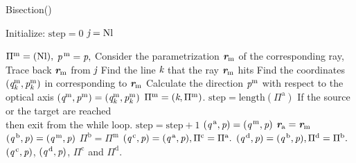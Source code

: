 \begin{algorithm}
\caption{Bisection()}\label{alg:bisection}
Initialize: $\textrm{step} = 0$ $\textit{j} = \textrm{Nl}$
\begin{algorithmic}[1]
\State $\Pi^{\textrm{m}}= (\textrm{Nl}),$
\State $\textit{p}^{\,\textrm{m}}=\textit{p},$
\State Consider the parametrization $\textit{\textbf{r}}_{\textrm{m}}$ of the corresponding ray,
\State Trace back $\textit{\textbf{r}}_{\textrm{m}}$ from $\textit{j}$
\State Find the line $\textit{k}$ that the ray $\textit{\textbf{r}}_{\textrm{m}}$ hits 
\State Find the coordinates $(\textit{q}^{\textrm{m}}_{\textit{k}}, \textit{p}^{\textrm{m}}_{\textit{k}})$ in  corresponding to $\textit{\textbf{r}}_{\textrm{m}}$
\State Calculate the direction $\textit{p}^{\textrm{m}}$ with respect to the optical axis
\State $(\textit{q}^{\textrm{m}}, \textit{p}^{\textrm{m}}) = (\textit{q}^{\textrm{m}}_{\textit{k}}, \textit{p}^{\textrm{m}}_{\textit{k}})$
\State $\Pi^{\textrm{m}}=(\textit{k},\Pi^{\textrm{m}})$.
\State $\textrm{step} = \mbox{length}(\Pi^\textrm{a})$ \Comment If the source or the target are reached \\  \Comment then exit from the while loop.
\Else \State $\textrm{step}=\textrm{step}+1$ 
\EndIf
\EndWhile
{}
\State $(\textit{q}^{\,\textrm{a}}, \textit{p})= (\textit{q}^{\,\textrm{m}}, \textit{p})$
\State $\textit{\textbf{r}}_{\textrm{a}}= \textit{\textbf{r}}_{\textrm{m}}$
\Else 
\State $(\textit{q}^{\,\textrm{b}}, \textit{p})= (\textit{q}^{\,\textrm{m}}, \textit{p})$
\State $\Pi^\textrm{b} =  \Pi^{\textrm{m}}$
\EndIf
\EndWhile
\State $(\textit{q}^{\,\textrm{c}}, \textit{p})= (\textit{q}^{\,\textrm{a}}, \textit{p}), \Pi^\textrm{c}= \Pi^{\textrm{a}}.$
\State $(\textit{q}^{\,\textrm{d}}, \textit{p})= (\textit{q}^{\,\textrm{b}}, \textit{p}), \Pi^\textrm{d}= \Pi^{\textrm{b}}.$
\State \Return $(\textit{q}^{\,\textrm{c}}, \textit{p})$, $(\textit{q}^{\,\textrm{d}}, \textit{p})$, $\Pi^{\textrm{c}}$ and $\Pi^{\textrm{d}}$.
\end{algorithmic}
\end{algorithm}
